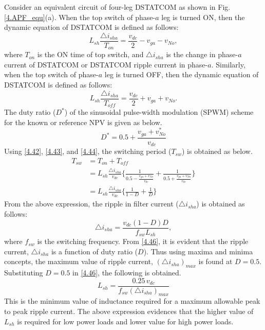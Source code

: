 Consider an equivalent circuit of four-leg DSTATCOM as shown in Fig.\,\ref{4.APF_equ}(a). When the top switch of phase-$a$ leg is turned ON, then the dynamic equation of DSTATCOM is defined as follows:
\begin{equation} \label{4.42}
L_{sh}\frac{\triangle i_{sha}}{T_{on}} = \frac{v_{dc}}{2} - v_{ga} - v_{No},
\end{equation}
where $T_{on}$ is the ON time of top switch, and $\triangle i_{sha}$ is the change in phase-$a$ current of DSTATCOM or DSTATCOM ripple current in phase-$a$. Similarly, when the top switch of phase-$a$ leg is turned OFF, then the dynamic equation of DSTATCOM is defined as follows:
\begin{equation} \label{4.43}
L_{sh}\frac{\triangle i_{sha}}{T_{off}} = \frac{v_{dc}}{2} + v_{ga} + v_{No}.
\end{equation}
The duty ratio ($D^{*}$) of the sinusoidal pulse-width modulation (SPWM) scheme for the known or reference NPV is given as below.
\begin{equation} \label{4.44}
D^{*} = 0.5 + \frac{v_{ga} + v^{*}_{No}}{v_{dc}}
\end{equation}
Using \eqref{4.42}, \eqref{4.43}, and \eqref{4.44}, the switching period ($T_{sw}$) is obtained as below.
\begin{equation} \label{4.45}
\begin{aligned}
T_{sw} &= T_{on} + T_{off} \\
       &= L_{sh}\frac{\triangle i_{sha}}{v_{dc}} \Bigg\{ \frac{1}{0.5 - \frac{v_{ga} + v_{No}}{v_{dc}}} + \frac{1}{0.5 + \frac{v_{ga} +    v_{No}}{v_{dc}}} \Bigg\} \\
       &= L_{sh}\frac{\triangle i_{sha}}{v_{dc}} \bigg\{ \frac{1}{1-D} + \frac{1}{D}\bigg\}
\end{aligned}
\end{equation}
From the above expression, the ripple in filter current ($\triangle i_{sha}$) is obtained as follows:
\begin{equation} \label{4.46}
\triangle i_{sha} = \frac{v_{dc}(1-D)D}{f_{sw}L_{sh}},
\end{equation}
where $f_{sw}$ is the switching frequency. From \eqref{4.46}, it is evident that the ripple current, $\triangle i_{sha}$ is a function of duty ratio ($D$). Thus using maxima and minima concepts, the maximum value of ripple current, $(\triangle i_{sha})_{max}$ is found at $D=0.5$. Substituting $D=0.5$ in \eqref{4.46}, the following is obtained.
\begin{equation} \label{4.47}
L_{sh} = \frac{0.25\, v_{dc}}{f_{sw}(\triangle i_{sha})_{max}}
\end{equation}
This is the minimum value of inductance required for a maximum allowable peak to peak ripple current. The above expression evidences that the higher value of $L_{sh}$ is required for low power loads and lower value for high power loads. 

